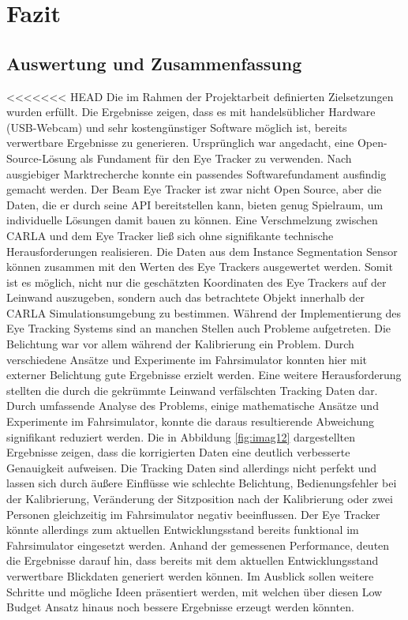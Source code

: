 \chapter{Fazit}
\label{sec:fazit}

\section{Auswertung und Zusammenfassung}

<<<<<<< HEAD
Die im Rahmen der Projektarbeit definierten Zielsetzungen wurden erfüllt. Die Ergebnisse zeigen, dass es mit handelsüblicher Hardware (USB-Webcam) und sehr kostengünstiger Software möglich ist, bereits verwertbare Ergebnisse zu generieren. Ursprünglich war angedacht, eine Open-Source-Lösung als Fundament für den Eye Tracker zu verwenden. Nach ausgiebiger Marktrecherche konnte ein passendes Softwarefundament ausfindig gemacht werden. Der Beam Eye Tracker ist zwar nicht Open Source, aber die Daten, die er durch seine API bereitstellen kann, bieten genug Spielraum, um individuelle Lösungen damit bauen zu können. Eine Verschmelzung zwischen CARLA und dem Eye Tracker ließ sich ohne signifikante technische Herausforderungen realisieren. Die Daten aus dem Instance Segmentation Sensor können zusammen mit den Werten des Eye Trackers ausgewertet werden. Somit ist es möglich, nicht nur die geschätzten Koordinaten des Eye Trackers auf der Leinwand auszugeben, sondern auch das betrachtete Objekt innerhalb der CARLA Simulationsumgebung zu bestimmen.
Während der Implementierung des Eye Tracking Systems sind an manchen Stellen auch Probleme aufgetreten. Die Belichtung war vor allem während der Kalibrierung ein Problem. Durch verschiedene Ansätze und Experimente im Fahrsimulator konnten hier mit externer Belichtung gute Ergebnisse erzielt werden.
Eine weitere Herausforderung stellten die durch die gekrümmte Leinwand verfälschten Tracking Daten dar. Durch umfassende Analyse des Problems, einige mathematische Ansätze und Experimente im Fahrsimulator, konnte die daraus resultierende Abweichung signifikant reduziert werden. Die in Abbildung \ref{fig:imag12} dargestellten Ergebnisse zeigen, dass die korrigierten Daten eine deutlich verbesserte Genauigkeit aufweisen.
Die Tracking Daten sind allerdings nicht perfekt und lassen sich durch äußere Einflüsse wie schlechte Belichtung, Bedienungsfehler bei der Kalibrierung, Veränderung der Sitzposition nach der Kalibrierung oder zwei Personen gleichzeitig im Fahrsimulator negativ beeinflussen. Der Eye Tracker könnte allerdings zum aktuellen Entwicklungsstand bereits funktional im Fahrsimulator eingesetzt werden. Anhand der gemessenen Performance, deuten die Ergebnisse darauf hin, dass bereits mit dem aktuellen Entwicklungsstand verwertbare Blickdaten generiert werden können. Im Ausblick sollen weitere Schritte und mögliche Ideen präsentiert werden, mit welchen über diesen Low Budget Ansatz hinaus noch bessere Ergebnisse erzeugt werden könnten.

